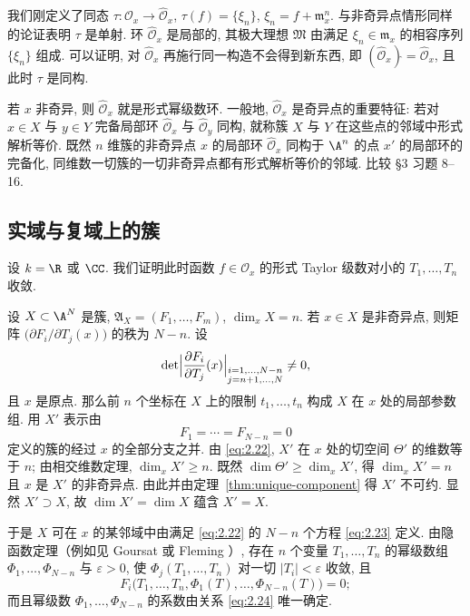 我们刚定义了同态 $\tau: \mathcal O_x \to \widehat{\mathcal O}_x$, $\tau(f) = \{\xi_n\}$, $\xi_n = f + \mathfrak m_x^n$. 与非奇异点情形同样的论证表明 $\tau$ 是单射. 环 $\widehat{\mathcal O}_x$ 是局部的, 其极大理想 $\mathfrak M$ 由满足 $\xi_n \in \mathfrak m_x$ 的相容序列 $\{\xi_n\}$ 组成. 可以证明, 对 $\widehat{\mathcal O}_x$ 再施行同一构造不会得到新东西, 即 $(\widehat{\mathcal O}_x)\widehat{} = \widehat{\mathcal O}_x$, 且此时 $\tau$ 是同构.

若 $x$ 非奇异, 则 $\widehat{\mathcal O}_x$ 就是形式幂级数环. 一般地, $\widehat{\mathcal O}_x$ 是奇异点的重要特征: 若对 $x \in X$ 与 $y \in Y$ 完备局部环 $\widehat{\mathcal O}_x$ 与 $\widehat{\mathcal O}_y$ 同构, 就称簇 $X$ 与 $Y$ 在这些点的邻域中形式解析等价. 既然 $n$ 维簇的非奇异点 $x$ 的局部环 $\widehat{\mathcal O}_x$ 同构于 $\A^n$ 的点 $x'$ 的局部环的完备化, 同维数一切簇的一切非奇异点都有形式解析等价的邻域. 比较 §3 习题 8--16.

\subsection{实域与复域上的簇}

设 $k = \R$ 或 $\CC$. 我们证明此时函数 $f \in \mathcal O_x$ 的形式 Taylor 级数对小的 $T_1, \ldots, T_n$ 收敛.

设 $X \subset \A^N$ 是簇, $\mathfrak A_X = (F_1, \ldots, F_m)$, $\dim_x X = n$. 若 $x \in X$ 是非奇异点, 则矩阵 $\bigl( \partial F_i/\partial T_j(x) \bigr)$ 的秩为 $N - n$. 设
\begin{equation}
	\label{eq:2.22}
	\det \Bigl| \frac{\partial F_i}{\partial T_j}(x) \Bigr|_{\substack{i = 1, \ldots, N-n \\ j = n+1, \ldots, N}} \ne 0,
\end{equation}
且 $x$ 是原点. 那么前 $n$ 个坐标在 $X$ 上的限制 $t_1, \ldots, t_n$ 构成 $X$ 在 $x$ 处的局部参数组. 用 $X'$ 表示由
\begin{equation}
	\label{eq:2.23}
	F_1 = \cdots = F_{N-n} = 0
\end{equation}
定义的簇的经过 $x$ 的全部分支之并. 由 \eqref{eq:2.22}, $X'$ 在 $x$ 处的切空间 $\Theta'$ 的维数等于 $n$; 由相交维数定理, $\dim_x X' \ge n$. 既然 $\dim \Theta' \ge \dim_x X'$, 得 $\dim_x X' = n$ 且 $x$ 是 $X'$ 的非奇异点. 由此并由定理~\ref{thm:unique-component} 得 $X'$ 不可约. 显然 $X' \supset X$, 故 $\dim X' = \dim X$ 蕴含 $X' = X$.

于是 $X$ 可在 $x$ 的某邻域中由满足 \eqref{eq:2.22} 的 $N - n$ 个方程 \eqref{eq:2.23} 定义. 由隐函数定理（例如见 Goursat \cite[第 IX 章 \S\S 187--190]{goursat1916} 或 Fleming \cite[\S 4.6]{fleming1977}）, 存在 $n$ 个变量 $T_1, \ldots, T_n$ 的幂级数组 $\Phi_1, \ldots, \Phi_{N-n}$ 与 $\varepsilon > 0$, 使 $\Phi_j(T_1, \ldots, T_n)$ 对一切 $|T_i| < \varepsilon$ 收敛, 且
\begin{equation}
	\label{eq:2.24}
	F_i\bigl( T_1, \ldots, T_n, \Phi_1(T), \ldots, \Phi_{N-n}(T) \bigr) = 0;
\end{equation}
而且幂级数 $\Phi_1, \ldots, \Phi_{N-n}$ 的系数由关系 \eqref{eq:2.24} 唯一确定.

